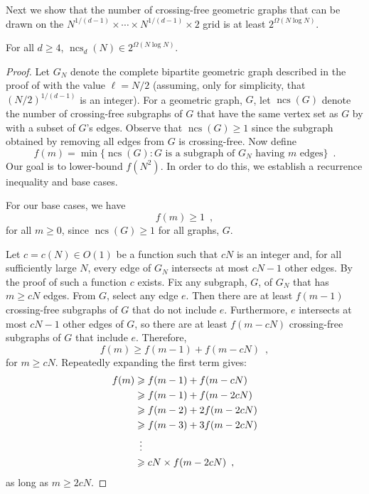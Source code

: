 \documentclass[12pt]{article}
\newcommand{\n}{N}
\DeclareMathOperator{\ncs}{ncs}
\begin{document}
Next we show that the number of crossing-free geometric graphs that can
be drawn on the $\n^{1/(d-1)}\times \cdots\times\n^{1/(d-1)}\times 2$
grid is at least $2^{\Omega(\n\log\n)}$.

\begin{thm}
  For all $d\ge 4$, $\ncs_d(\n) \in 2^{\Omega(\n\log\n)}$.
\end{thm}

\begin{proof}
  Let $G_\n$ denote the complete bipartite geometric graph described in
  the proof of  with the value $\ell=\n/2$ (assuming,
  only for simplicity, that $(\n/2)^{1/(d-1)}$ is an integer).  For a geometric
  graph, $G$, let $\ncs(G)$ denote the number of crossing-free subgraphs
  of $G$ that have the same vertex set as $G$ by with a subset of $G$'s edges.    Observe that $\ncs(G)\ge 1$ since the subgraph obtained by removing all edges
  from $G$ is crossing-free.
  Now define
  \[
     f(m) = \min\{ \ncs(G) : 
                \mbox{$G$ is a subgraph of $G_{\n}$ having $m$ edges} \}
     \enspace . 
  \]
  Our goal is to lower-bound $f(\n^2)$.  In order to do this, we establish
  a recurrence inequality and base cases.
  
  For our base cases, we have 
  \[ 
     f(m)\ge 1 \enspace ,
  \]
  for all $m\ge 0$, since $\ncs(G)\ge 1$ for all graphs, $G$.
  
  Let $c=c(\n)\in O(1)$ be a function such that $c\n$ is an integer and, 
  for all sufficiently large $\n$, every edge of $G_\n$ intersects at most 
  $c\n-1$
  other edges.  By the proof of  such a function
  $c$ exists.  Fix any subgraph, $G$, of $G_{\n}$ that has $m\ge c\n$ edges.
  From $G$, select any edge $e$. Then there are at least $f(m-1)$
  crossing-free subgraphs of $G$ that do not include $e$.  Furthermore, 
  $e$ intersects
  at most $c\n-1$ other edges of $G$, so there are at least $f(m-c\n)$
  crossing-free subgraphs of $G$ that include $e$.  Therefore,
  \[  
     f(m) \ge f(m-1) + f(m-c\n) \enspace ,
  \]
  for $m\ge c\n$.  Repeatedly expanding the first term gives:
  \begin{align}
  f(m) & \ge  f(m-1) + f(m-c\n) \notag \\
         & \ge  f(m-1) + f(m-2c\n) \notag \\
         & \ge  f(m-2) + 2f(m-2c\n) \notag \\
         & \ge  f(m-3) + 3f(m-2c\n) \notag \\
         & \,\,\,\vdots  \notag \\
         & \ge  c\n\times f(m-2c\n) \enspace , \eqlabel{blech}
  \end{align}
  as long as $m\ge 2c\n$.
  

\end{proof}
\end{document}
